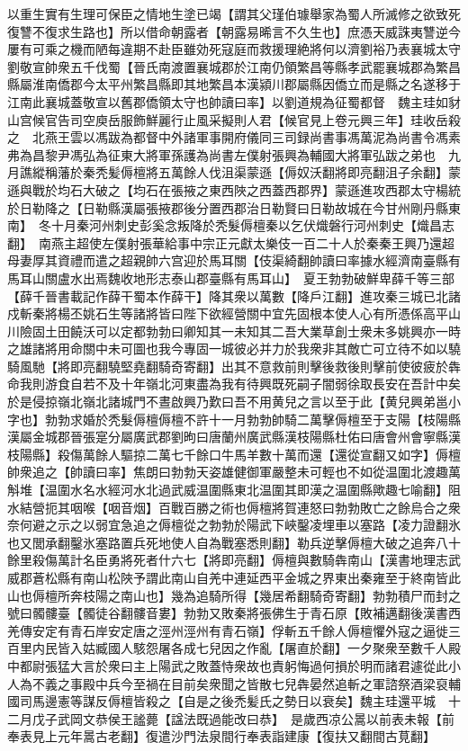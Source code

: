以重生實有生理可保臣之情地生塗已竭【謂其父瑾伯璩舉家為蜀人所滅修之欲致死復讐不復求生路也】所以借命朝露者【朝露易晞言不久生也】庶憑天威誅夷讐逆今屢有可乘之機而陋每違期不赴臣雖効死寇庭而救援理絶將何以濟劉裕乃表襄城太守劉敬宣帥衆五千伐蜀【晉氏南渡置襄城郡於江南仍領繁昌等縣孝武罷襄城郡為繁昌縣屬淮南僑郡今太平州繁昌縣即其地繁昌本漢潁川郡屬縣因僑立而是縣之名遂移于江南此襄城蓋敬宣以舊郡僑領太守也帥讀曰率】以劉道規為征蜀都督　魏主珪如豺山宫候官告司空庾岳服飾鮮麗行止風采擬則人君【候官見上卷元興三年】珪收岳殺之　北燕王雲以馮跋為都督中外諸軍事開府儀同三司録尚書事馮萬泥為尚書令馮素弗為昌黎尹馮弘為征東大將軍孫護為尚書左僕射張興為輔國大將軍弘跋之弟也　九月譙縱稱藩於秦秃髪傉檀將五萬餘人伐沮渠蒙遜【傉奴沃翻將即亮翻沮子余翻】蒙遜與戰於均石大破之【均石在張掖之東西陜之西蓋西郡界】蒙遜進攻西郡太守楊統於日勒降之【日勒縣漢屬張掖郡後分置西郡治日勒賢曰日勒故城在今甘州剛丹縣東南】　冬十月秦河州刺史彭奚念叛降於秃髮傉檀秦以乞伏熾磐行河州刺史【熾昌志翻】　南燕主超使左僕射張華給事中宗正元獻太樂伎一百二十人於秦秦王興乃還超母妻厚其資禮而遣之超親帥六宫迎於馬耳關【伎渠綺翻帥讀曰率據水經濟南臺縣有馬耳山關盧水出焉魏收地形志泰山郡臺縣有馬耳山】　夏王勃勃破鮮卑薛千等三部【薛千晉書載記作薛干蜀本作薛干】降其衆以萬數【降戶江翻】進攻秦三城已北諸戍斬秦將楊丕姚石生等諸將皆曰陛下欲經營關中宜先固根本使人心有所憑係高平山川險固土田饒沃可以定都勃勃曰卿知其一未知其二吾大業草創士衆未多姚興亦一時之雄諸將用命關中未可圖也我今專固一城彼必并力於我衆非其敵亡可立待不如以驍騎風馳【將即亮翻驍堅堯翻騎奇寄翻】出其不意救前則擊後救後則擊前使彼疲於犇命我則游食自若不及十年嶺北河東盡為我有待興既死嗣子闇弱徐取長安在吾計中矣於是侵掠嶺北嶺北諸城門不晝啟興乃歎曰吾不用黄兒之言以至于此【黄兒興弟邕小字也】勃勃求婚於秃髮傉檀傉檀不許十一月勃勃帥騎二萬擊傉檀至于支陽【枝陽縣漢屬金城郡晉張寔分屬廣武郡劉昫曰唐蘭州廣武縣漢枝陽縣杜佑曰唐會州會寧縣漢枝陽縣】殺傷萬餘人驅掠二萬七千餘口牛馬羊數十萬而還【還從宣翻又如字】傉檀帥衆追之【帥讀曰率】焦朗曰勃勃天姿雄健御軍嚴整未可輕也不如從温圍北渡趣萬斛堆【温圍水名水經河水北過武威温圍縣東北温圍其即漢之温圍縣歟趣七喻翻】阻水結營扼其咽喉【咽音烟】百戰百勝之術也傉檀將賀連怒曰勃勃敗亡之餘烏合之衆奈何避之示之以弱宜急追之傉檀從之勃勃於陽武下峽鑿凌埋車以塞路【凌力證翻氷也又閭承翻鑿氷塞路置兵死地使人自為戰塞悉則翻】勒兵逆擊傉檀大破之追奔八十餘里殺傷萬計名臣勇將死者什六七【將即亮翻】傉檀與數騎犇南山【漢書地理志武威郡蒼松縣有南山松陜予謂此南山自羌中連延西平金城之界東出秦雍至于終南皆此山也傉檀所奔枝陽之南山也】幾為追騎所得【幾居希翻騎奇寄翻】勃勃積尸而封之號曰髑髏臺【髑徒谷翻髏音婁】勃勃又敗秦將張佛生于青石原【敗補邁翻後漢書西羌傳安定有青石岸安定唐之涇州涇州有青石嶺】俘斬五千餘人傉檀懼外寇之逼徙三百里内民皆入姑臧國人駭怨屠各成七兒因之作亂【屠直於翻】一夕聚衆至數千人殿中都尉張猛大言於衆曰主上陽武之敗蓋恃衆故也責躬悔過何損於明而諸君遽從此小人為不義之事殿中兵今至禍在目前矣衆聞之皆散七兒犇晏然追斬之軍諮祭酒梁裒輔國司馬邊憲等謀反傉檀皆殺之【自是之後禿髪氏之勢日以衰矣】魏主珪還平城　十二月戊子武岡文恭侯王謐薨【諡法既過能改曰恭】　是歲西凉公暠以前表未報【前奉表見上元年暠古老翻】復遣沙門法泉間行奉表詣建康【復扶又翻間古莧翻】

